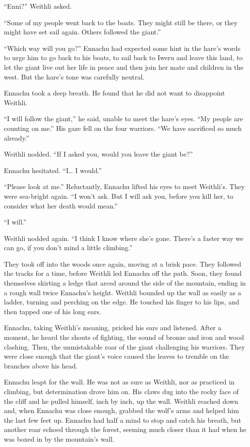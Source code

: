 ``Enni?'' Weithli asked.

``Some of my people went back to the boats. They might still be there, or they might have set sail again. Others followed the giant.''

``Which way will you go?'' Ennachu had expected some hint in the hare's words to urge him to go back to his boats, to sail back to Iweru and leave this land, to let the giant live out her life in peace and then join her mate and children in the west. But the hare's tone was carefully neutral.

Ennachu took a deep breath. He found that he did not want to disappoint Weithli.

``I will follow the giant,'' he said, unable to meet the hare's eyes. ``My people are counting on me.'' His gaze fell on the four warriors. ``We have sacrificed so much already.''

Weithli nodded. ``If I asked you, would you leave the giant be?''

Ennachu hesitated. ``I\ldots{} I would.''

``Please look at me.'' Reluctantly, Ennachu lifted his eyes to meet Weithli's. They were sea-bright again. ``I won't ask. But I will ask you, before you kill her, to consider what her death would mean.''

``I will.''

Weithli nodded again. ``I think I know where she's gone. There's a faster way we can go, if you don't mind a little climbing.''

They took off into the woods once again, moving at a brisk pace. They followed the tracks for a time, before Weithli led Ennachu off the path. Soon, they found themselves skirting a ledge that arced around the side of the mountain, ending in a rough wall twice Ennachu's height. Weithli bounded up the wall as easily as a ladder, turning and perching on the edge. He touched his finger to his lips, and then tapped one of his long ears.

Ennachu, taking Weithli's meaning, pricked his ears and listened. After a moment, he heard the shouts of fighting, the sound of bronze and iron and wood clashing. Then, the unmistakable roar of the giant challenging his warriors. They were close enough that the giant's voice caused the leaves to tremble on the branches above his head.

Ennachu leapt for the wall. He was not as sure as Weithli, nor as practiced in climbing, but determination drove him on. His claws dug into the rocky face of the cliff and he pulled himself, inch by inch, up the wall. Weithli reached down and, when Ennachu was close enough, grabbed the wolf's arms and helped him the last few feet up. Ennachu had half a mind to stop and catch his breath, but another roar echoed through the forest, seeming much closer than it had when he was boxed in by the mountain's wall.

